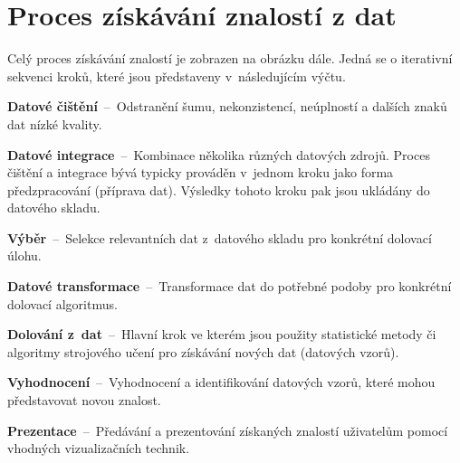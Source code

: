 
\section{Proces získávání znalostí z dat}

\begin{compactitem}
    \item Celý proces získávání znalostí je zobrazen na obrázku dále. Jedná se o iterativní sekvenci kroků, které jsou představeny v~následujícím výčtu.
\end{compactitem}

\begin{compactenum}
    \item \textbf{Datové čištění}~--~Odstranění šumu, nekonzistencí, neúplností a dalších znaků dat nízké kvality.

    \item \textbf{Datové integrace}~--~Kombinace několika různých datových zdrojů. Proces čištění a integrace bývá typicky prováděn v~jednom kroku jako forma předzpracování (příprava dat). Výsledky tohoto kroku pak jsou ukládány do datového skladu.

    \item \textbf{Výběr}~--~Selekce relevantních dat z~datového skladu pro konkrétní dolovací úlohu.

    \item \textbf{Datové transformace}~--~Transformace dat do potřebné podoby pro konkrétní dolovací algoritmus.

    \item \textbf{Dolování z~dat}~--~Hlavní krok ve kterém jsou použity statistické metody či algoritmy strojového učení pro získávání nových dat (datových vzorů).

    \item \textbf{Vyhodnocení}~--~Vyhodnocení a identifikování datových vzorů, které mohou představovat novou znalost.

    \item \textbf{Prezentace}~--~Předávání a prezentování získaných znalostí uživatelům pomocí vhodných vizualizačních technik.
\end{compactenum}


